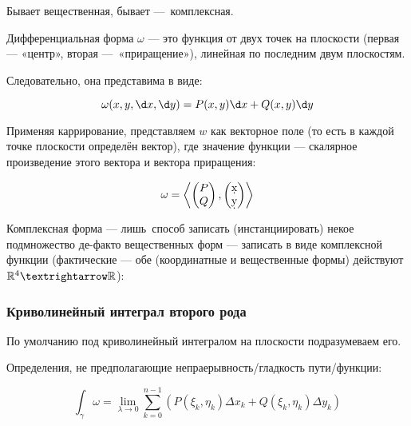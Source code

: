 \documentclass[12pt, a4paper, oneside]{memoir}
\begin{document}
\begin{definition}
    
    Бывает вещественная, бывает — комплексная.

Дифференциальная форма $\omega$ — это функция от двух точек на плоскости (первая — «центр», вторая — «приращение»), линейная по последним двум плоскостям.

Следовательно, она представима в виде:

\begin{equation}
    \omega(x, y, \d x, \d y) = P(x, y) \d x + Q(x, y) \d y
\end{equation}

Применяя каррирование, представляем $w$ как векторное поле (то есть в каждой точке плоскости определён вектор),
где значение функции — скалярное произведение этого вектора и вектора приращения:

\begin{equation}
    \omega = \left\langle \begin{pmatrix}
        P \\ Q
    \end{pmatrix}, \begin{pmatrix}
        \d x \\ 
        \d y
    \end{pmatrix} \right\rangle
\end{equation}


    Комплексная форма — лишь способ записать (инстанциировать) некое подмножество де-факто вещественных форм —
    записать в виде комплексной функции (фактические — обе (координатные и вещественные формы) действуют $\sR^4 → \sR$):
\end{definition}


\subsubsection{Криволинейный интеграл \textbf{второго} рода}

По умолчанию под криволинейный интегралом на плоскости подразумеваем его.

Определения, не предполагающие непраерывность/гладкость пути/функции:

\begin{equation}
    \int_\gamma \omega=\lim _{\lambda \rightarrow 0} \sum_{k=0}^{n-1}\left(P\left(\xi_k, \eta_k\right) \Delta x_k+Q\left(\xi_k, \eta_k\right) \Delta y_k\right)
\end{equation}
\end{document}
